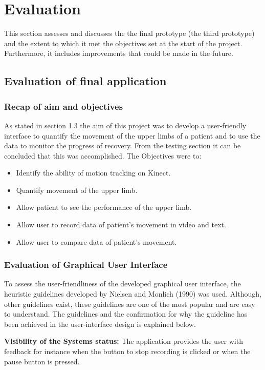 \documentclass[a4paper, 12pt]{article}
\begin{document}
\section{Evaluation}
This section assesses and discusses the the final prototype (the third prototype) and the extent to which it met the objectives set at the start of the project. Furthermore, it includes improvements that could be made in the future. 

\subsection{Evaluation of final application}

\subsubsection{Recap of aim and objectives}
As stated in section 1.3 the aim of this project was to develop a user-friendly interface to quantify the movement of the upper limbs of a patient and to use the data to monitor the progress of recovery. From the testing section it can be concluded that this was accomplished. The Objectives were to: 

\begin{itemize}
	\item Identify the ability of motion tracking on Kinect.
	\item Quantify movement of the upper limb.
	\item Allow patient to see the performance of the upper limb.
	\item Allow user to record data of patient’s movement in video and text.
	\item Allow user to compare data of patient’s movement.
\end{itemize}

\subsubsection{Evaluation of Graphical User Interface}
To assess the user-friendliness of the developed graphical user interface, the heuristic guidelines developed by Nielsen and Monlich (1990) was used. Although, other guidelines exist, these guidelines are one of the most popular and are easy to understand.  The guidelines and the confirmation for why the guideline has been achieved in the user-interface design is explained below. 


\textbf{Visibility of the Systems status:} The application provides the user with feedback for instance when the button to stop recording is clicked or when the pause button is pressed. 
\end{document}
